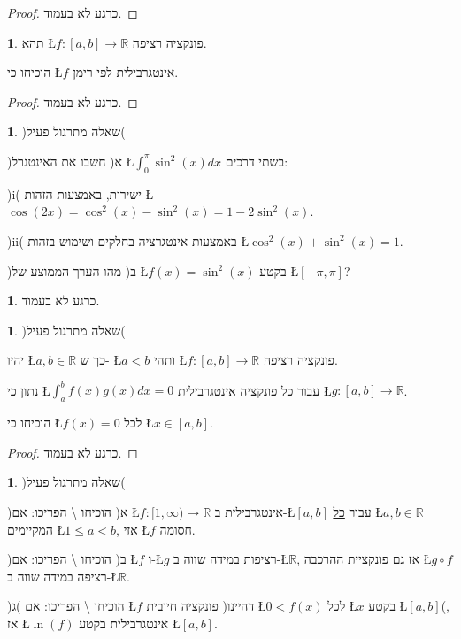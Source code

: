 \documentclass[english,hebrew]{article}
\theoremstyle{plain}
\theoremstyle{definition}
\newtheorem{xca}[thm]{\protect\exercisename}
\theoremstyle{definition}
\newtheorem*{sol*}{\protect\solutionname}
\providecommand{\exercisename}{תרגיל}
\providecommand{\solutionname}{פתרון}
\begin{document}
\begin{proof}
כרגע לא בעמוד.
\end{proof}
\begin{xca}
תהא \L{$f:\left[a,b\right]\rightarrow\mathbb{R}$} פונקציה רציפה. 

הוכיחו כי \L{$f$} אינטגרבילית לפי רימן.
\end{xca}

\begin{proof}
כרגע לא בעמוד.
\end{proof}
\begin{xca}
)שאלה מתרגול פעיל(

)א( חשבו את האינטגרל \L{$\int_{0}^{\pi}\sin^{2}(x)dx$} בשתי דרכים:

)i( ישירות, באמצעות הזהות \L{$\cos(2x)=\cos^{2}(x)-\sin^{2}(x)=1-2\sin^{2}(x)$}.

)ii( באמצעות אינטגרציה בחלקים ושימוש בזהות \L{$\cos^{2}(x)+\sin^{2}(x)=1$}.

)ב( מהו הערך הממוצע של \L{$f(x)=\sin^{2}(x)$} בקטע \L{$[-\pi,\pi]$}? 
\end{xca}

\begin{sol*}
כרגע לא בעמוד.
\end{sol*}
\begin{xca}
)שאלה מתרגול פעיל(

יהיו \L{$a,b\in\mathbb{R}$} כך ש- \L{$a<b$} ותהי \L{$f:[a,b]\to\mathbb{R}$}
פונקציה רציפה.

נתון כי \L{$\int_{a}^{b}f(x)g(x)dx=0$} עבור כל פונקציה אינטגרבילית
\L{$g:[a,b]\to\mathbb{R}$}.

הוכיחו כי \L{$f(x)=0$} לכל \L{$x\in[a,b]$}.
\end{xca}

\begin{proof}
כרגע לא בעמוד.
\end{proof}
\begin{xca}
)שאלה מתרגול פעיל(

)א( הוכיחו \textbackslash{} הפריכו: אם \L{$f:[1,\infty)\to\mathbb{R}$}
אינטגרבילית ב-\L{$[a,b]$} עבור \uline{כל} \L{$a,b\in\mathbb{R}$}
המקיימים \L{$1\leq a<b$}, אזי \L{$f$} חסומה.

)ב( הוכיחו \textbackslash{} הפריכו: אם \L{$f$} ו-\L{$g$} רציפות
במידה שווה ב-\L{$\mathbb{R}$}, אז גם פונקציית ההרכבה \L{$g\circ f$}
רציפה במידה שווה ב-\L{$\mathbb{R}$}.

)ג( הוכיחו \textbackslash{} הפריכו: אם \L{$f$} פונקציה חיובית )דהיינו
\L{$0<f(x)$} לכל \L{$x$} בקטע \L{$[a,b]$}(, אז \L{$\ln(f)$} אינטגרבילית
בקטע \L{$[a,b]$}. 
\end{xca}
\end{document}
